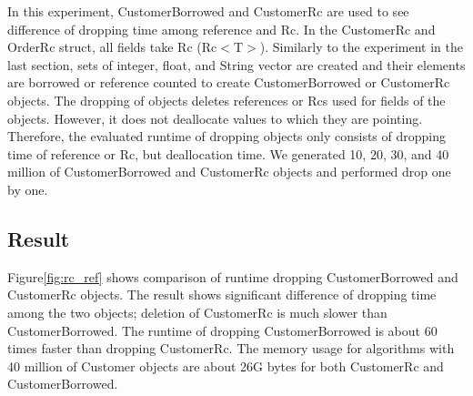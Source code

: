 

In this experiment, CustomerBorrowed and CustomerRc are used to see difference of dropping time among reference and Rc. 
In the CustomerRc and OrderRc struct, all fields take Rc (Rc$<$T$>$). Similarly to the experiment in the last section, 
sets of integer, float, and String vector are created and their elements are borrowed or reference counted to create CustomerBorrowed or CustomerRc objects.
The dropping of objects deletes references or Rcs used for fields of the objects. However, it does not deallocate values to which they are pointing. 
Therefore, the evaluated runtime of dropping objects only consists of dropping time of reference or Rc, but deallocation time.
We generated 10, 20, 30, and 40 million of CustomerBorrowed and CustomerRc objects and performed drop one by one. 

\subsection{Result}
Figure\ref{fig:rc_ref} shows comparison of runtime dropping CustomerBorrowed and CustomerRc objects. 
The result shows significant difference of dropping time among the two objects; deletion of CustomerRc is much slower than CustomerBorrowed. 
The runtime of dropping CustomerBorrowed is about 60 times faster than dropping CustomerRc. 
The memory usage for algorithms with 40 million of Customer objects are about 26G bytes for both CustomerRc and CustomerBorrowed.

